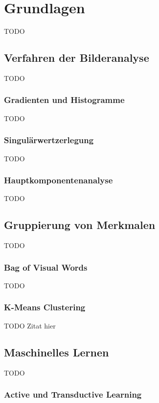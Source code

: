 \chapter{Grundlagen}

TODO

\section{Verfahren der Bilderanalyse}

TODO

\subsection{Gradienten und Histogramme}

TODO

\subsection{Singulärwertzerlegung}

TODO

\subsection{Hauptkomponentenanalyse}

TODO

\section{Gruppierung von Merkmalen}

TODO

\subsection{Bag of Visual Words}

TODO

\subsection{K-Means Clustering}

TODO
Zitat hier \cite{rum2011}

\section{Maschinelles Lernen}

TODO

\subsection{Active und Transductive Learning}

